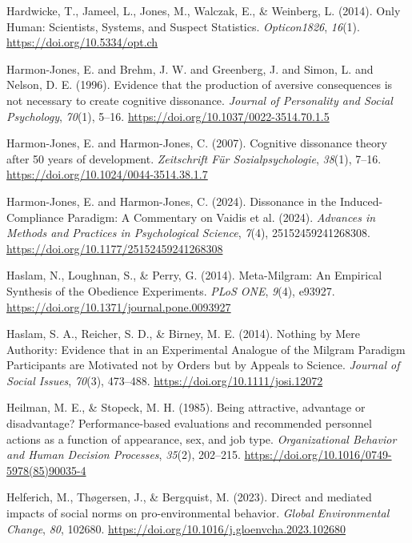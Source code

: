 \documentclass[
  letterpaper,
]{book}
\newlength{\cslhangindent}
\newenvironment{CSLReferences}[2] %
 {\begin{list}{}{%
  \setlength{\itemindent}{0pt}
  \setlength{\leftmargin}{0pt}
  \setlength{\parsep}{0pt}
  \ifodd #1
   \setlength{\leftmargin}{\cslhangindent}
   \setlength{\itemindent}{-1\cslhangindent}
  \fi
  \setlength{\itemsep}{#2\baselineskip}}}
 {\end{list}}
\begin{document}
\begin{CSLReferences}{1}{0}
Hardwicke, T., Jameel, L., Jones, M., Walczak, E., \& Weinberg, L.
(2014). Only {Human}: {Scientists}, {Systems}, and {Suspect}
{Statistics}. \emph{Opticon1826}, \emph{16}(1).
\url{https://doi.org/10.5334/opt.ch}

Harmon-Jones, E. and Brehm, J. W. and Greenberg, J. and Simon, L. and
Nelson, D. E. (1996). {Evidence that the production of aversive
consequences is not necessary to create cognitive dissonance}.
\emph{{Journal of Personality and Social Psychology}}, \emph{70}(1),
5--16. \url{https://doi.org/10.1037/0022-3514.70.1.5}

Harmon-Jones, E. and Harmon-Jones, C. (2007). {Cognitive dissonance
theory after 50 years of development}. \emph{{Zeitschrift Für
Sozialpsychologie}}, \emph{38}(1), 7--16.
\url{https://doi.org/10.1024/0044-3514.38.1.7}

Harmon-Jones, E. and Harmon-Jones, C. (2024). {Dissonance in the
Induced-Compliance Paradigm: A Commentary on Vaidis et al. (2024)}.
\emph{{Advances in Methods and Practices in Psychological Science}},
\emph{7}(4), 25152459241268308.
\url{https://doi.org/10.1177/25152459241268308}

Haslam, N., Loughnan, S., \& Perry, G. (2014). Meta-{Milgram}: {An}
{Empirical} {Synthesis} of the {Obedience} {Experiments}. \emph{PLoS
ONE}, \emph{9}(4), e93927.
\url{https://doi.org/10.1371/journal.pone.0093927}

Haslam, S. A., Reicher, S. D., \& Birney, M. E. (2014). Nothing by
{Mere} {Authority}: {Evidence} that in an {Experimental} {Analogue} of
the {Milgram} {Paradigm} {Participants} are {Motivated} not by {Orders}
but by {Appeals} to {Science}. \emph{Journal of Social Issues},
\emph{70}(3), 473--488. \url{https://doi.org/10.1111/josi.12072}

Heilman, M. E., \& Stopeck, M. H. (1985). Being attractive, advantage or
disadvantage? {Performance}-based evaluations and recommended personnel
actions as a function of appearance, sex, and job type.
\emph{Organizational Behavior and Human Decision Processes},
\emph{35}(2), 202--215.
\url{https://doi.org/10.1016/0749-5978(85)90035-4}

Helferich, M., Thøgersen, J., \& Bergquist, M. (2023). Direct and
mediated impacts of social norms on pro-environmental behavior.
\emph{Global Environmental Change}, \emph{80}, 102680.
\url{https://doi.org/10.1016/j.gloenvcha.2023.102680}


\end{CSLReferences}
\end{document}
